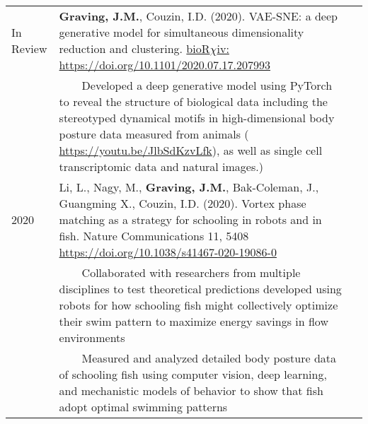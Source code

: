 \documentclass[letterpaper,10pt,oneside]{article}
\newcommand{\tabitem}{~~\hspace{5mm}\llap{ \textbullet}~~}
\begin{document}
\begin{small}
\begin{longtable}{@{} l p{5.3in}l}
\large{In Review}
& \textbf{Graving, J.M.}, Couzin, I.D. (2020).  VAE-SNE: a deep generative model for simultaneous dimensionality reduction and clustering. \vspace{1mm} \href{https://doi.org/10.1101/2020.07.17.207993}{bioR$\chi$iv: https://doi.org/10.1101/2020.07.17.207993} \\
& 	\tabitem Developed a deep generative model using PyTorch to reveal the structure of biological data including the stereotyped dynamical motifs in high-dimensional body posture data measured from animals ( \href{https://youtu.be/JlbSdKzvLfk}{https://youtu.be/JlbSdKzvLfk}), as well as  single cell transcriptomic data and natural images.)  \vspace{2mm}\\
\large{2020}
& Li, L., Nagy, M., \textbf{Graving, J.M.}, Bak-Coleman, J., Guangming X., Couzin, I.D. (2020). Vortex phase matching as a strategy for schooling in robots and in fish. Nature Communications 11, 5408 \href{https://doi.org/10.1038/s41467-020-19086-0 }{https://doi.org/10.1038/s41467-020-19086-0} \vspace{1mm} \\
& 	\tabitem Collaborated with researchers from multiple disciplines to test theoretical predictions developed using robots for how schooling fish might collectively optimize their swim pattern to maximize energy savings in flow environments \\
& 	\tabitem Measured and analyzed detailed body posture data of schooling fish using computer vision, deep learning, and mechanistic models of behavior to show that fish adopt optimal swimming patterns\\


\end{longtable}
\end{small}
\end{document}
